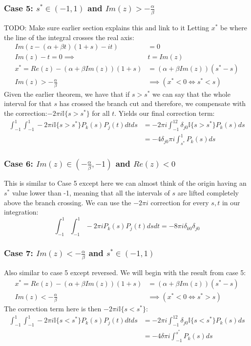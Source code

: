\documentclass{article}
\begin{document}
\subsubsection{Case 5: $s^*\in(-1,1)$ and $Im(z)>-\frac{\alpha}{\beta}$}
TODO: Make sure earlier section explains this and link to it
Letting $x^*$ be where the line of the integral crosses the real axis:
\begin{align}
    Im(z-(\alpha+\beta t)(1+s)-it)&=0\\
    Im(z)-t=0\implies &t=Im(z)\\
    x^*=Re(z)-(\alpha+\beta Im(z))(1+s)&=(\alpha+\beta Im(z))(s^*-s)\\
    Im(z)>-\frac{\alpha}{\beta}&\implies (x^*<0 \iff s^*<s)
\end{align}
Given the earlier theorem, we have that if $s>s^*$ we can say that the whole interval for that $s$ has crossed the branch cut and therefore, we compensate with the correction:$-2\pi i\mathbb{I}\{s>s^*\}$ for all $t$.
Yields our final correction term:
\begin{align}
    \int_{-1}^1\int_{-1}^1-2\pi i\mathbb{I}\{s>s^*\}P_k(s)P_j(t)dtds&=-2\pi i\int_{-1}^12\delta_{j0}\mathbb{I}\{s>s^*\}P_k(s)ds\\
    &=-4\delta_{j0}\pi i\int_{s^*}^1P_k(s)ds
\end{align}

\subsubsection{Case 6: $Im(z)\in(-\frac{\alpha}{\beta},-1)$ and $Re(z)<0$}
This is similar to Case 5 except here we can almost think of the origin having an $s^*$ value lower than -1, meaning that all the intervals of $s$ are lifted completely above the branch crossing.
We can use the $-2\pi i$ correction for every $s,t$ in our integration:
$$\int_{-1}^1\int_{-1}^1-2\pi iP_k(s)P_j(t)dsdt=-8\pi i\delta_{k0}\delta_{j0}$$

\subsubsection{Case 7: $Im(z)<-\frac{\alpha}{\beta}$ and $s^*\in(-1,1)$}
Also similar to case 5 except reversed.
We will begin with the result from case 5:
\begin{align}
    x^*=Re(z)-(\alpha+\beta Im(z))(1+s)&=(\alpha+\beta Im(z))(s^*-s)\\
    Im(z)<-\frac{\alpha}{\beta}&\implies (x^*<0 \iff s^*>s)
\end{align}
The correction term here is then $-2\pi i\mathbb{I}\{s<s^*\}$:
\begin{align}
    \int_{-1}^1\int_{-1}^1-2\pi i\mathbb{I}\{s<s^*\}P_k(s)P_j(t)dtds&=-2\pi i\int_{-1}^12\delta_{j0}\mathbb{I}\{s<s^*\}P_k(s)ds\\
    &=-4\delta\pi i\int_{-1}^{s^*}P_k(s)ds
\end{align}
\end{document}
